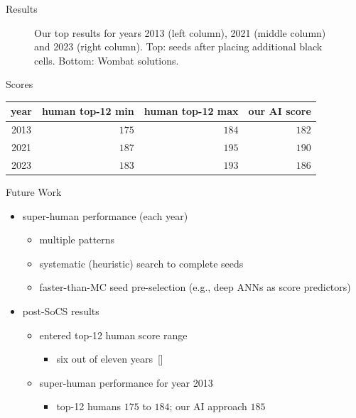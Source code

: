 \documentclass[aspectratio=169,usenames,dvipsnames]{beamer}
\newcommand{\tco}[1]{\textcolor{m2}{#1}}
\newcommand{\tcg}[1]{\textcolor{m5}{#1}}
\newcommand{\bei}{\begin{itemize}}
\newcommand{\eei}{\end{itemize}}
\newcommand{\ie}{\item}
\numberwithin{equation}{section}
\numberwithin{theorem}{section}
\numberwithin{lem}{section}
\numberwithin{df}{section}
\begin{document}
\begin{frame}{Results}
\begin{figure}
\caption{Our top results for years 2013 (left column), 2021 (middle column) and 2023 (right column). Top: seeds after placing additional black cells. Bottom: {\sc Wombat} solutions.}
\end{figure}

\end{frame}


\begin{frame}{Scores}

\begin{table}[htbp]
\centering
\begin{tabular}{c|r|r|r}
\toprule
{\bf year} & {\bf human top-12 min} & {\bf human top-12 max} & {\bf our AI score} \\
\midrule
2013 & $175$ & $184$ & \tcg{$182$} \\ 
2021 & $187$ & $195$ & \tcg{$190$} \\ 
2023 & $183$ & $193$ & \tcg{$186$} \\ 
\bottomrule
\end{tabular}
\end{table}


\end{frame}




\begin{frame}{Future Work}

\bei

\ie super-human performance (each year)
\bei
\ie multiple patterns
\ie systematic (heuristic) search to complete seeds
\ie faster-than-MC seed pre-selection (e.g., deep ANNs as score predictors)
\eei

\bigskip
\bigskip

\ie post-SoCS results
\bei
\ie entered top-12 human score range
\bei
\ie six out of eleven years~[\cite{boteaCOGshort2023}]
\eei
\ie \tco{super-human performance for year 2013}
\bei
\ie top-12 humans $175$ to $184$; our AI approach $185$
\eei
\eei

\bigskip

\eei


\end{frame}


\end{document}
